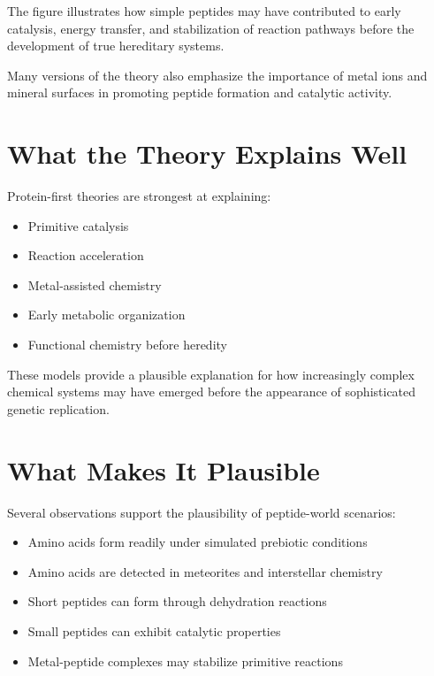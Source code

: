 \documentclass[
  oneside]{book}
\providecommand{\tightlist}{%
  \setlength{\itemsep}{0pt}\setlength{\parskip}{0pt}}
\begin{document}
The figure illustrates how simple peptides may have contributed to early catalysis, energy transfer, and stabilization of reaction pathways before the development of true hereditary systems.

Many versions of the theory also emphasize the importance of metal ions and mineral surfaces in promoting peptide formation and catalytic activity.

\section{What the Theory Explains Well}\label{what-the-theory-explains-well-6}

Protein-first theories are strongest at explaining:

\begin{itemize}
\tightlist
\item
  Primitive catalysis
\item
  Reaction acceleration
\item
  Metal-assisted chemistry
\item
  Early metabolic organization
\item
  Functional chemistry before heredity
\end{itemize}

These models provide a plausible explanation for how increasingly complex chemical systems may have emerged before the appearance of sophisticated genetic replication.

\section{What Makes It Plausible}\label{what-makes-it-plausible-6}

Several observations support the plausibility of peptide-world scenarios:

\begin{itemize}
\tightlist
\item
  Amino acids form readily under simulated prebiotic conditions
\item
  Amino acids are detected in meteorites and interstellar chemistry
\item
  Short peptides can form through dehydration reactions
\item
  Small peptides can exhibit catalytic properties
\item
  Metal-peptide complexes may stabilize primitive reactions
\end{itemize}
\end{document}
